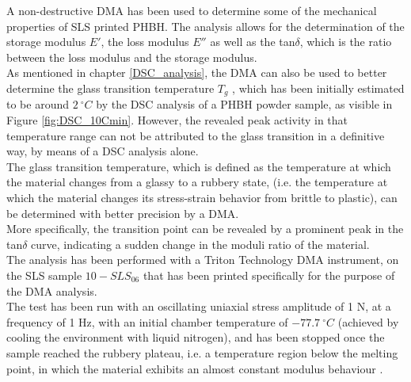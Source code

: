 \documentclass[a4paper]{article}
\begin{document}
        A non-destructive DMA has been used to determine some of the mechanical properties of SLS printed PHBH. The analysis 
        allows for the determination of the storage modulus $E'$, the loss modulus $E''$ as well as the tan$\delta$, 
        which is the ratio between the loss modulus and the storage modulus. \\ 

        As mentioned in chapter \ref{DSC_analysis}, the DMA can also be used to better determine the glass transition temperature $T_g$
        \autocites{Glass_transition_DMA}, which 
        has been initially estimated to be around $2 \ ^{\circ}C$ by the DSC analysis of a PHBH powder sample, as visible in Figure \ref{fig:DSC_10Cmin}. 
        However, the revealed 
        peak activity in that temperature range can not be attributed to the glass transition in a definitive way, by means of a DSC analysis 
        alone. \\ 

        The glass transition temperature, which is defined as the temperature at which the material changes from a glassy to a rubbery state, 
        (i.e. the temperature at which the material changes its stress-strain behavior from brittle to plastic), can be determined with 
        better precision by a DMA. \\ 

        More specifically, the transition point can be revealed by a prominent peak in the tan$\delta$ curve, indicating a 
        sudden change in the moduli ratio of the material. \\ 
        
        The analysis has been performed with a Triton Technology DMA instrument, on the SLS sample 
        $10-SLS_{06}$ that has been printed specifically for the purpose of the DMA analysis. \\ 

        The test has been run with an oscillating uniaxial stress amplitude of 1 N, at a frequency of 1 Hz, with an initial 
        chamber temperature of $- 77.7 \ ^{\circ}C$ (achieved by cooling the environment with liquid nitrogen), and has been stopped 
        once the sample reached the rubbery plateau, i.e. a temperature region below the melting point, in which the material 
        exhibits an almost constant modulus behaviour \autocites{JD_Ferry_viscoelasticpolymers}. \\

        \clearpage
\end{document}
